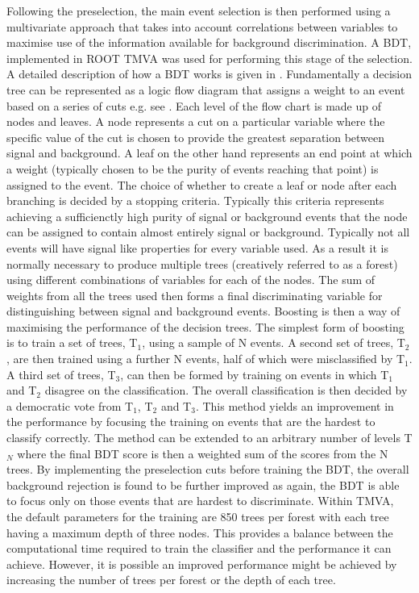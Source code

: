 Following the preselection, the main event selection is then performed using a multivariate approach that takes into account correlations between variables to maximise use of the information available for background discrimination. A \ac{BDT}, implemented in ROOT TMVA \cite{2007physics...3039H} was used for performing this stage of the selection. A detailed description of how a BDT works is given in \cite{Coadou:2013lca}. Fundamentally a decision tree can be represented as a logic flow diagram that assigns a weight to an event based on a series of cuts e.g. see . Each level of the flow chart is made up of nodes and leaves. A node represents a cut on a particular variable where the specific value of the cut is chosen to provide the greatest separation between signal and background. A leaf on the other hand represents an end point at which a weight (typically chosen to be the purity of events reaching that point) is assigned to the event. The choice of whether to create a leaf or node after each branching is decided by a stopping criteria. Typically this criteria represents achieving a sufficienctly high purity of signal or background events that the node can be assigned to contain almost entirely signal or background. Typically not all events will have signal like properties for every variable used. As a result it is normally necessary to produce multiple trees (creatively referred to as a forest) using different combinations of variables for each of the nodes. The sum of weights from all the trees used then forms a final discriminating variable for distinguishing between signal and background events. Boosting is then a way of maximising the performance of the decision trees. The simplest form of boosting is to train a set of trees, T$_1$, using a sample of N events. A second set of trees, T$_2$, are then trained using a further N events, half of which were misclassified by T$_1$. A third set of trees, T$_3$,  can then be formed by training on events in which T$_1$ and T$_2$ disagree on the classification. The overall classification is then decided by a democratic vote from T$_1$, T$_2$ and T$_3$. This method yields an improvement in the performance by focusing the training on events that are the hardest to classify correctly. The method can be extended to an arbitrary number of levels T$_N$ where the final \ac{BDT} score is then a weighted sum of the scores from the N trees. By implementing the preselection cuts before training the \ac{BDT}, the overall background rejection is found to be further improved as again, the \ac{BDT} is able to focus only on those events that are hardest to discriminate. Within TMVA, the default parameters for the training are 850 trees per forest with each tree having a maximum depth of three nodes. This provides a balance between the computational time required to train the classifier and the performance it can achieve. However, it is possible an improved performance might be achieved by increasing the number of trees per forest or the depth of each tree. 


